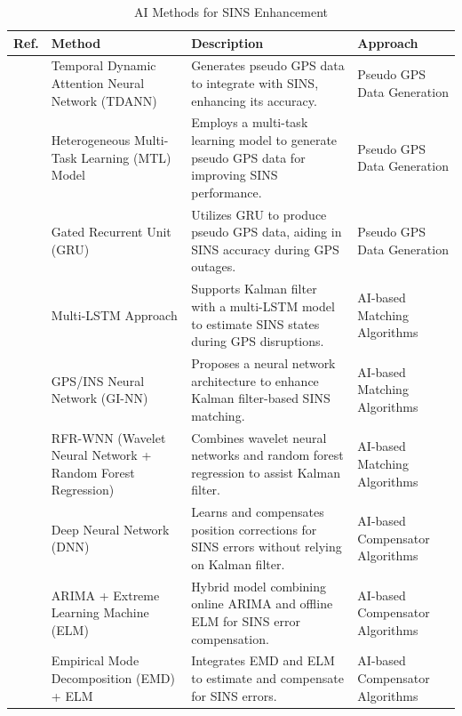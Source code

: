 \documentclass[3p]{elsarticle}
\begin{document}
\begin{table}[H]
    \centering
    \caption{AI Methods for SINS Enhancement}
    \begin{tabular}{|p{0.5cm}|p{4cm}|p{6cm}|p{3.5cm}|}
        \hline
        \textbf{Ref.} & \textbf{Method} & \textbf{Description} & \textbf{Approach} \\
        \hline
        \cite{10298043} & Temporal Dynamic Attention Neural Network (TDANN) & Generates pseudo GPS data to integrate with SINS, enhancing its accuracy. & Pseudo GPS Data Generation \\
        \hline
        \cite{9212618} & Heterogeneous Multi-Task Learning (MTL) Model & Employs a multi-task learning model to generate pseudo GPS data for improving SINS performance. & Pseudo GPS Data Generation \\
        \hline
        \cite{10215333} & Gated Recurrent Unit (GRU) & Utilizes GRU to produce pseudo GPS data, aiding in SINS accuracy during GPS outages. & Pseudo GPS Data Generation \\
        \hline
        \cite{9486855} & Multi-LSTM Approach & Supports Kalman filter with a multi-LSTM model to estimate SINS states during GPS disruptions. & AI-based Matching Algorithms \\
        \hline
        \cite{9722837} & GPS/INS Neural Network (GI-NN) & Proposes a neural network architecture to enhance Kalman filter-based SINS matching. & AI-based Matching Algorithms \\
        \hline
        \cite{9386104} & RFR-WNN (Wavelet Neural Network + Random Forest Regression) & Combines wavelet neural networks and random forest regression to assist Kalman filter. & AI-based Matching Algorithms \\
        \hline
        \cite{Kanherenavi.548} & Deep Neural Network (DNN) & Learns and compensates position corrections for SINS errors without relying on Kalman filter. & AI-based Compensator Algorithms \\
        \hline
        \cite{8314549} & ARIMA + Extreme Learning Machine (ELM) & Hybrid model combining online ARIMA and offline ELM for SINS error compensation. & AI-based Compensator Algorithms \\
        \hline
        \cite{9036942} & Empirical Mode Decomposition (EMD) + ELM & Integrates EMD and ELM to estimate and compensate for SINS errors. & AI-based Compensator Algorithms \\
        \hline
    \end{tabular}
    \label{tab:sins-methods}
\end{table}
\end{document}
